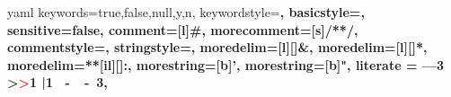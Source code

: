 \setcounter{handson}{1}
\setcounter{preframe_handson}{1}
\newcommand{\HandsOn}[1]{Hands On \Roman{handson} -- #1 \addtocounter{handson}{1}}

\setcounter{exercise}{1}

\newcommand{\Exercise}{\theexercise . Excercise \addtocounter{exercise}{1}}

\setcounter{interlude}{1}
\setcounter{preframe_interlude}{1}


\newcommand{\Interlude}[1]{Interlude -- #1}

\usepackage{marvosym}
\usepackage{multicol}

\usepackage{hhline}

\usepackage{times}

\newcommand\Fontvi{\fontsize{6}{7.2}\selectfont}
% 
\usepackage{dirtree,float} %
\usepackage[nodisplayskipstretch]{setspace}


\usepackage{verbatim}
\usepackage{listings}

\newcommand\YAMLcolonstyle{\color{red}\mdseries}
\newcommand\YAMLkeystyle{\color{black}\bfseries}
\newcommand\YAMLvaluestyle{\color{blue}\mdseries}

\makeatletter

\newcommand\language@yaml{yaml}

\expandafter\expandafter\expandafter\lstdefinelanguage
\expandafter{\language@yaml}
{
	keywords={true,false,null,y,n},
	keywordstyle=\color{darkgray}\bfseries,
	basicstyle=\YAMLkeystyle,                                 %
	sensitive=false,
	comment=[l]{\#},
	morecomment=[s]{/*}{*/},
	commentstyle=\color{purple}\ttfamily,
	stringstyle=\YAMLvaluestyle\ttfamily,
	moredelim=[l][\color{orange}]{\&},
	moredelim=[l][\color{magenta}]{*},
	moredelim=**[il][\YAMLcolonstyle{:}\YAMLvaluestyle]{:},   %
	morestring=[b]',
	morestring=[b]",
	literate =    {---}{{\ProcessThreeDashes}}3
	{>}{{\textcolor{red}\textgreater}}1     
	{|}{{\textcolor{red}\textbar}}1 
	{\ -\ }{{\mdseries\ -\ }}3,
}

